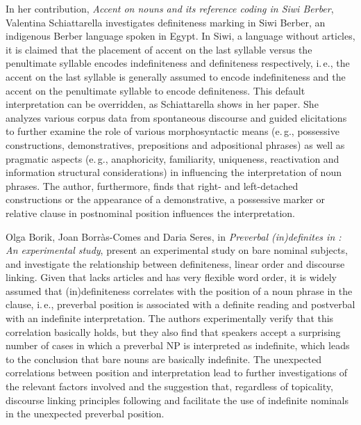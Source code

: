 \documentclass[output=paper]{langsci/langscibook}
\begin{document}
In her contribution, {\emph{Accent on nouns and its reference coding in Siwi Berber}}, %
Valentina Schiattarella investigates definiteness marking in Siwi Berber, an indigenous Berber language spoken in Egypt. In Siwi, a language without articles, it is claimed that the placement of accent on the last syllable versus the penultimate syllable encodes indefiniteness and definiteness respectively, i.\,e., the accent on the last syllable is generally assumed to encode indefiniteness and the accent on the penultimate syllable to encode definiteness. This default interpretation can be overridden, as Schiattarella shows in her paper. She analyzes various corpus data from spontaneous discourse and guided elicitations to further examine the role of various morphosyntactic means (e.\,g., possessive constructions, demonstratives, prepositions and adpositional phrases) as well as pragmatic aspects (e.\,g., anaphoricity, familiarity, uniqueness, reactivation and information structural considerations) in influencing the interpretation of noun phrases. The author, furthermore, finds that right- and left-detached constructions or the appearance of a demonstrative, a possessive marker or relative clause in postnominal position influences the interpretation.

Olga Borik, Joan Borr\`as-Comes and Daria Seres, in {\emph{Preverbal (in)definites in : An experimental study}}, %
present an experimental study on  bare nominal subjects, and investigate the relationship between definiteness, linear order and discourse linking. Given that  lacks articles and has very flexible word order, it is widely assumed that (in)definiteness correlates with the position of a noun phrase in the clause, i.\,e., preverbal position is associated with a definite reading and postverbal with an indefinite interpretation. The authors experimentally verify that this correlation basically holds, but they also find that speakers accept a surprising number of cases in which a preverbal NP is interpreted as indefinite, which leads to the conclusion that  bare nouns are basically indefinite. The unexpected correlations between position and interpretation lead to further investigations of the relevant factors involved and the suggestion that, regardless of topicality, discourse linking principles following \citet{pesetsky:87} and \citet{dyakonova:09} facilitate the use of indefinite nominals in the unexpected preverbal position.
\end{document}
